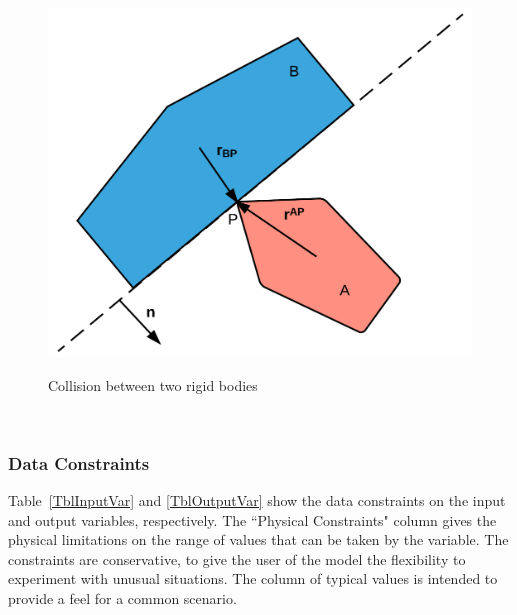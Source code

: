 \documentclass[12pt]{article}
\begin{document}
\begin{figure}[htbp]
	\begin{center}
		{
			\includegraphics[width=1\textwidth]{CollisionDiagram.png}
		}
		\bigskip
		\caption{\label{Fig_collision}Collision between two rigid bodies}
	\end{center}
\end{figure}

~\newline

\subsubsection{Data Constraints} \label{sec_DataConstraints}    

Table~\ref{TblInputVar} and \ref{TblOutputVar} show the data constraints on the input and output variables, respectively.  The ``Physical Constraints" column gives the physical limitations on the range of values that can be taken by the
variable.  The constraints are conservative, to give the user of the model the
flexibility to experiment with unusual situations.  The column of typical values
is intended to provide a feel for a common scenario. 
\end{document}
